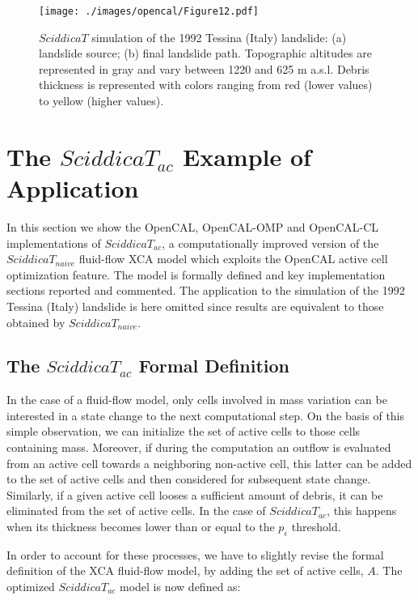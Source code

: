 \begin{figure}
	\begin{center}
		\texttt{[image: ./images/opencal/Figure12.pdf]}
		\caption{$SciddicaT$ simulation of the 1992 Tessina (Italy) landslide: (a) landslide source; (b) final landslide path. Topographic altitudes are represented in gray and vary between 1220 and 625 m a.s.l. Debris
		thickness is represented with colors ranging from red (lower values)
		to yellow (higher values).}
		\label{fig:sciddicaT-simulation}
	\end{center}
\end{figure}

\section{The $SciddicaT_{ac}$ Example of Application}
\label{sec:SciddicaT-ac}

In this section we show the OpenCAL, OpenCAL-OMP and OpenCAL-CL
implementations of $SciddicaT_{ac}$, a computationally improved
version of the $SciddicaT_{naive}$ fluid-flow XCA model which
exploits the OpenCAL active cell optimization feature. The model is
formally defined and key implementation sections reported and
commented. The application to the simulation of the 1992 Tessina
(Italy) landslide is here omitted since results are equivalent to
those obtained by $SciddicaT_{naive}$.

\subsection{The $SciddicaT_{ac}$ Formal Definition}
In the case of a fluid-flow model, only cells involved in mass
variation can be interested in a state change to the next
computational step. On the basis of this simple observation, we
can initialize the set of active cells to those cells containing
mass. Moreover, if during the computation an outflow is evaluated
from an active cell towards a neighboring non-active cell, this
latter can be added to the set of active cells and then considered
for subsequent state change. Similarly, if a given active cell
looses a sufficient amount of debris, it can be eliminated from
the set of active cells. In the case of $SciddicaT_{ac}$, this
happens when its thickness becomes lower than or equal to the
$p_\epsilon$ threshold.

In order to account for these processes, we have to slightly
revise the formal definition of the XCA fluid-flow model, by
adding the set of active cells, $A$. The optimized
$SciddicaT_{ac}$ model is now defined as:


